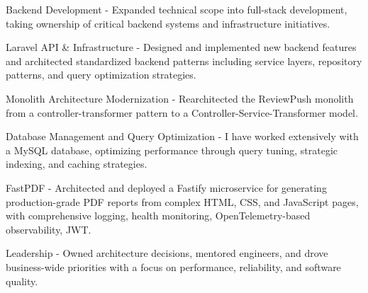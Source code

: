 \begin{cventries}
{\begin{cvsubitems}
        \end{cvsubitems}
        \begin{cvitems} %
            \item {Backend Development - Expanded technical scope into full-stack development, taking ownership of critical backend systems and infrastructure initiatives.}
        \end{cvitems}
        \begin{cvsubitems}
            \item {Laravel API \& Infrastructure - Designed and implemented new backend features and architected standardized backend patterns including service layers, repository patterns, and query optimization strategies.}
            \item {Monolith Architecture Modernization - Rearchitected the ReviewPush monolith from a controller-transformer pattern to a Controller-Service-Transformer model.}
            \item {Database Management and Query Optimization - I have worked extensively with a MySQL database, optimizing performance through query tuning, strategic indexing, and caching strategies.}
            \item {FastPDF - Architected and deployed a Fastify microservice for generating production-grade PDF reports from complex HTML, CSS, and JavaScript pages, with comprehensive logging, health monitoring, OpenTelemetry-based observability, JWT.}
        \end{cvsubitems}
        \begin{cvitems}
            \item {Leadership - Owned architecture decisions, mentored engineers, and drove business-wide priorities with a focus on performance, reliability, and software quality.}
        \end{cvitems}
    }
\end{cventries}
